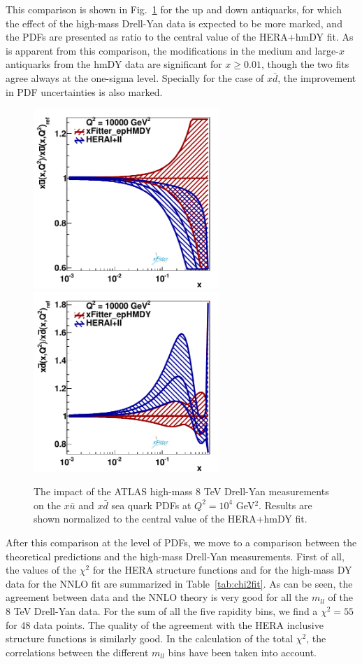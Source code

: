 This comparison is shown in Fig.~\ref{fig:QCDfit} for the up and down antiquarks,
for which the effect of the high-mass
Drell-Yan data is expected to be more marked, and the PDFs are presented
as ratio to the central value of the HERA+hmDY fit.
%
As is apparent from this comparison, the modifications in the medium and large-$x$
antiquarks from the hmDY data are significant for $x\ge 0.01$, though the two fits
agree always at the one-sigma level.
%
Specially for the case of $x\bar{d}$, the improvement in PDF uncertainties
is also marked.

\begin{figure}[h]
\centering
\includegraphics[width=7cm]{figs/q2_10000_pdf_ubar_ratio}
\includegraphics[width=7cm]{figs/q2_10000_pdf_dbar_ratio} 
\caption{The impact of the ATLAS high-mass 8 TeV Drell-Yan measurements
  on the $x\bar{u}$ and $x\bar{d}$ sea quark PDFs at $Q^2=10^4$ GeV$^2$.
  Results are shown normalized to the central value of the HERA+hmDY fit.
}
\label{fig:QCDfit}
\end{figure}

After this comparison at the level of PDFs, we move to a comparison between the theoretical
predictions and the high-mass Drell-Yan measurements.
%
First of all, the values of the $\chi^2$ for the HERA structure functions
and for the high-mass DY data for the NNLO fit
are summarized in Table~\ref{tab:chi2fit}.
%
As can be seen, the agreement between data and the NNLO theory
is very good for all the $m_{ll}$ of the 8 TeV Drell-Yan data.
%
For the sum of all the five rapidity bins, we find a $\chi^2=55$
for 48 data points.
%
The quality of the agreement with the HERA inclusive structure functions
is similarly good.
%
In the calculation of the total $\chi^2$, the correlations between the different
$m_{ll}$ bins have been taken into account.

